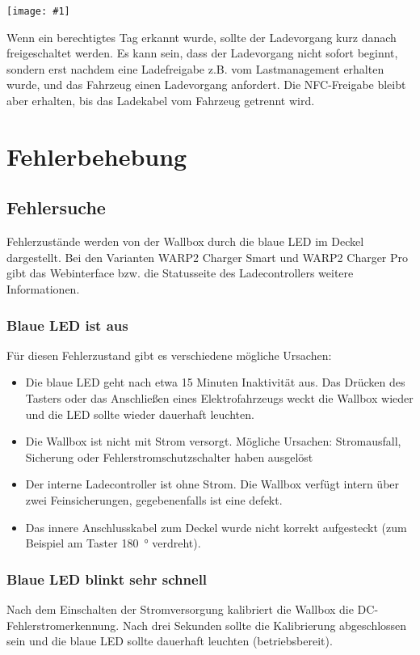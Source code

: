 \documentclass[a4paper,10pt]{article}
\newcommand{\gfx}[1]{\texttt{[image: \#1]}}
\begin{document}
\begin{multicols*}{2}
    \gfx{./img_warp2/resized/blink_nack}

    Wenn ein berechtigtes Tag erkannt wurde, sollte der Ladevorgang kurz danach
    freigeschaltet werden. Es kann sein, dass der Ladevorgang nicht
    sofort beginnt, sondern erst nachdem eine Ladefreigabe z.B. vom Lastmanagement erhalten wurde,
    und das Fahrzeug einen Ladevorgang anfordert. Die NFC-Freigabe bleibt aber erhalten,
    bis das Ladekabel vom Fahrzeug getrennt wird.

    \newpage \section{Fehlerbehebung}\label{fehlerbehebung} \subsection{Fehlersuche}
    Fehlerzustände werden von der Wallbox durch die blaue LED im Deckel
    dargestellt. Bei den Varianten WARP2 Charger Smart und WARP2 Charger Pro
    gibt das Webinterface bzw. die Statusseite des Ladecontrollers
    weitere Informationen.

    \subsubsection*{Blaue LED ist aus}
    Für diesen Fehlerzustand gibt es verschiedene mögliche Ursachen:
    \begin{itemize}
        \item Die blaue LED geht nach etwa 15 Minuten Inaktivität aus. Das Drücken des Tasters
              oder das Anschließen eines Elektrofahrzeugs weckt die Wallbox wieder
              und die LED sollte wieder dauerhaft leuchten.
        \item Die Wallbox ist nicht mit Strom versorgt. Mögliche Ursachen: Stromausfall,
              Sicherung oder Fehlerstrom\-schutzschalter haben ausgelöst
        \item Der interne Ladecontroller ist ohne Strom. Die Wallbox verfügt intern über zwei
              Feinsicherungen, gegebenenfalls ist eine defekt.
        \item Das innere Anschlusskabel zum Deckel wurde nicht korrekt aufgesteckt (zum Beispiel am Taster \SI{180}{\degree} verdreht).
    \end{itemize}

    \subsubsection*{Blaue LED blinkt sehr schnell}\label{fast_blink}
    Nach dem Einschalten der Stromversorgung kalibriert die Wallbox die
    DC-Fehlerstromerkennung. Nach drei Sekunden sollte die Kalibrierung
    abgeschlossen sein und die blaue LED sollte dauerhaft leuchten
    (betriebsbereit).


\end{multicols*}
\end{document}
